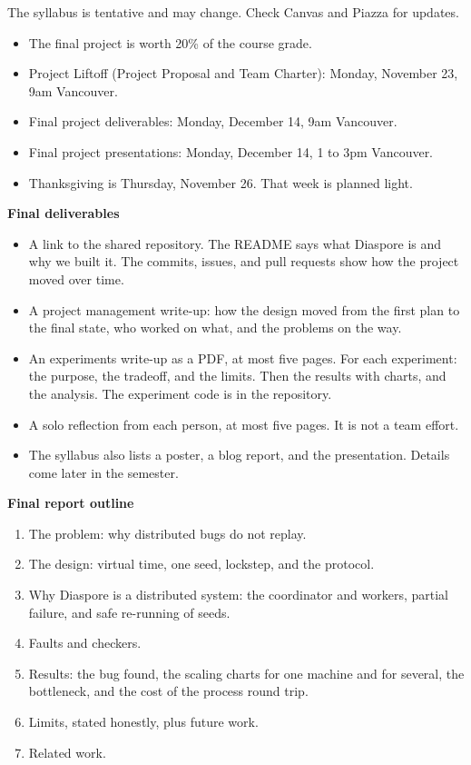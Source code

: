 \documentclass[12pt,letterpaper]{article}
\newcommand{\lbl}[1]{\textbf{#1}\enspace}
\begin{document}
The syllabus is tentative and may change. Check Canvas and Piazza for updates.

\begin{itemize}
  \item The final project is worth 20\% of the course grade.
  \item Project Liftoff (Project Proposal and Team Charter): Monday, November 23, 9am Vancouver.
  \item Final project deliverables: Monday, December 14, 9am Vancouver.
  \item Final project presentations: Monday, December 14, 1 to 3pm Vancouver.
  \item Thanksgiving is Thursday, November 26. That week is planned light.
\end{itemize}

\lbl{Final deliverables}

\begin{itemize}
  \item A link to the shared repository. The README says what Diaspore is and why we built it. The commits, issues, and pull requests show how the project moved over time.
  \item A project management write-up: how the design moved from the first plan to the final state, who worked on what, and the problems on the way.
  \item An experiments write-up as a PDF, at most five pages. For each experiment: the purpose, the tradeoff, and the limits. Then the results with charts, and the analysis. The experiment code is in the repository.
  \item A solo reflection from each person, at most five pages. It is not a team effort.
  \item The syllabus also lists a poster, a blog report, and the presentation. Details come later in the semester.
\end{itemize}

\lbl{Final report outline}

\begin{enumerate}
  \item The problem: why distributed bugs do not replay.
  \item The design: virtual time, one seed, lockstep, and the protocol.
  \item Why Diaspore is a distributed system: the coordinator and workers, partial failure, and safe re-running of seeds.
  \item Faults and checkers.
  \item Results: the bug found, the scaling charts for one machine and for several, the bottleneck, and the cost of the process round trip.
  \item Limits, stated honestly, plus future work.
  \item Related work.
\end{enumerate}
\end{document}
